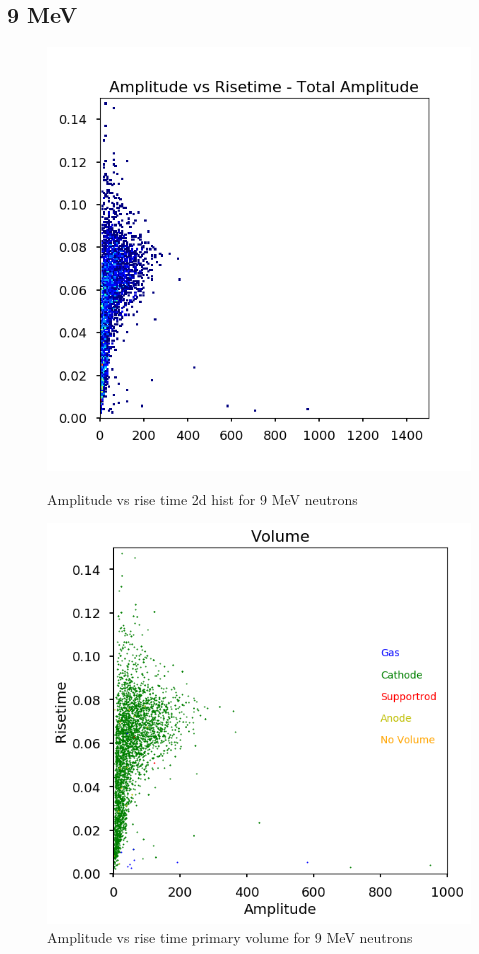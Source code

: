 \documentclass[a4paper]{article}
\begin{document}
\subsection{9 MeV}
\begin{figure}[H]
    \centering
    \begin{minipage}{.5\textwidth}
        \centering
        \includegraphics[width=1\linewidth]{Fast/steel_achinos-2d_fast-8.png}
        \caption{Amplitude vs rise time 2d hist for 9 MeV neutrons}
        \label{fig:prob1_6_2}
    \end{minipage}%
    \begin{minipage}{0.5\textwidth}
        \centering
        \includegraphics[width=1\linewidth]{Fast/steel_achinos_vol_38_fast-8.png}
        \caption{Amplitude vs rise time primary volume for 9 MeV neutrons}
        \label{fig:prob1_6_1}
    \end{minipage}
\end{figure}
\end{document}
